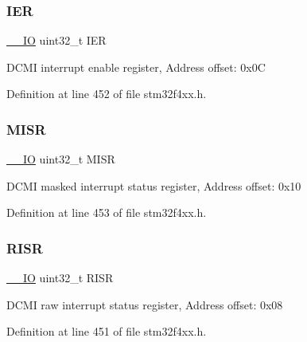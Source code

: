 \subsubsection{\texorpdfstring{I\+ER}{IER}}
{\footnotesize\ttfamily \hyperlink{group___c_m_s_i_s__core__definitions_gaec43007d9998a0a0e01faede4133d6be}{\+\_\+\+\_\+\+IO} uint32\+\_\+t I\+ER}

D\+C\+MI interrupt enable register, Address offset\+: 0x0C 

Definition at line 452 of file stm32f4xx.\+h.

\mbox{\label{struct_d_c_m_i___type_def_a524e134cec519206cb41d0545e382978}} 
\subsubsection{\texorpdfstring{M\+I\+SR}{MISR}}
{\footnotesize\ttfamily \hyperlink{group___c_m_s_i_s__core__definitions_gaec43007d9998a0a0e01faede4133d6be}{\+\_\+\+\_\+\+IO} uint32\+\_\+t M\+I\+SR}

D\+C\+MI masked interrupt status register, Address offset\+: 0x10 

Definition at line 453 of file stm32f4xx.\+h.

\mbox{\label{struct_d_c_m_i___type_def_aa196fddf0ba7d6e3ce29bdb04eb38b94}} 
\subsubsection{\texorpdfstring{R\+I\+SR}{RISR}}
{\footnotesize\ttfamily \hyperlink{group___c_m_s_i_s__core__definitions_gaec43007d9998a0a0e01faede4133d6be}{\+\_\+\+\_\+\+IO} uint32\+\_\+t R\+I\+SR}

D\+C\+MI raw interrupt status register, Address offset\+: 0x08 

Definition at line 451 of file stm32f4xx.\+h.

\mbox{\label{struct_d_c_m_i___type_def_af6aca2bbd40c0fb6df7c3aebe224a360}} 
